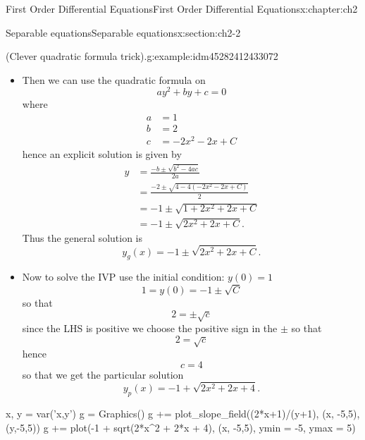 \documentclass[oneside,10pt,]{book}
\numberwithin{equation}{section}
\numberwithin{equation}{section}
\newcommand{\amp}{&}
\begin{document}
\begin{chapterptx}{First Order Differential Equations}{}{First Order Differential Equations}{}{}{x:chapter:ch2}
\begin{sectionptx}{Separable equations}{}{Separable equations}{}{}{x:section:ch2-2}
\begin{example}{(Clever quadratic formula trick).}{g:example:idm45282412433072}
\begin{itemize}[label=\textbullet]
\begin{align*}
\frac{dy}{dt}=\frac{2x+1}{y+1} \amp \iff \amp \int\left(y+1\right)dy=\int\left(2x+1\right)dx\\
\amp \iff \amp \frac{y^{2}}{2}+y=x^{2}+x+C\\
\amp \iff \amp \frac{y^{2}}{2}+y-x^{2}-x+c=0\\
\amp \iff \amp y^{2}+2y-2x^{2}-2x+C=0
\end{align*}
%
\item{}Then we can use the quadratic formula on%
\begin{equation*}
ay^{2}+by+c=0
\end{equation*}
where%
\begin{align*}
a \amp =1\\
b \amp =2\\
c \amp =-2x^{2}-2x+C
\end{align*}
hence an explicit solution is given by%
\begin{align*}
y \amp =\frac{-b\pm\sqrt{b^{2}-4ac}}{2a}\\
\amp =\frac{-2\pm\sqrt{4-4\left(-2x^{2}-2x+C\right)}}{2}\\
\amp =-1\pm\sqrt{1+2x^{2}+2x+C}\\
\amp =-1\pm\sqrt{2x^{2}+2x+C}.
\end{align*}
Thus the general solution is%
\begin{equation*}
y_g(x)=-1\pm\sqrt{2x^{2}+2x+C}.
\end{equation*}
%
\item{}Now to solve the IVP use the initial condition: \(y(0)=1\)%
\begin{equation*}
1=y(0)=-1\pm\sqrt{C}
\end{equation*}
so that%
\begin{equation*}
2=\pm\sqrt{c}
\end{equation*}
since the LHS is positive we choose the positive sign in the \(\pm\) so that%
\begin{equation*}
2=\sqrt{c}
\end{equation*}
hence%
\begin{equation*}
c=4
\end{equation*}
so that we get the particular solution%
\begin{equation*}
y_p(x)=-1+\sqrt{2x^{2}+2x+4}.
\end{equation*}
%
\end{itemize}
\begin{sageinput}
x, y = var('x,y')
g = Graphics()
g += plot_slope_field((2*x+1)/(y+1), (x, -5,5),(y,-5,5))
g += plot(-1 + sqrt(2*x^2 + 2*x + 4), (x, -5,5), ymin = -5, ymax = 5)

\end{sageinput}
\end{example}
\end{sectionptx}
\end{chapterptx}
\end{document}
